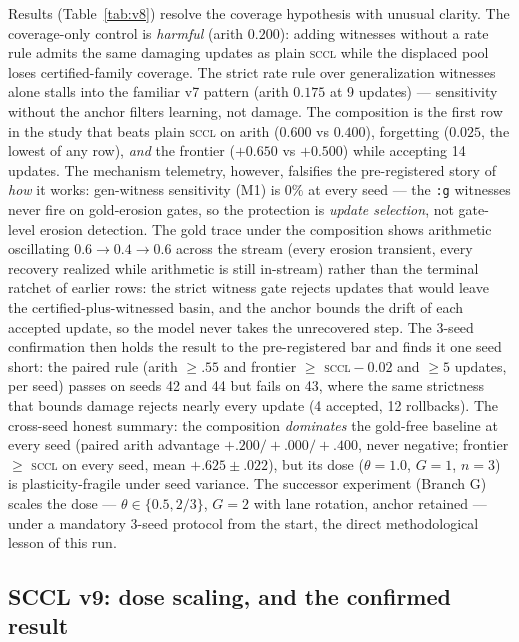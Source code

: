 \documentclass[10pt,conference]{IEEEtran}
\begin{document}
Results (Table~\ref{tab:v8}) resolve the coverage hypothesis with unusual clarity. The coverage-only control is \emph{harmful} (arith $0.200$): adding witnesses without a rate rule admits the same damaging updates as plain \textsc{sccl} while the displaced pool loses certified-family coverage. The strict rate rule over generalization witnesses alone stalls into the familiar v7 pattern (arith $0.175$ at 9 updates) --- sensitivity without the anchor filters learning, not damage. The composition is the first row in the study that beats plain \textsc{sccl} on arith ($0.600$ vs $0.400$), forgetting ($0.025$, the lowest of any row), \emph{and} the frontier ($+0.650$ vs $+0.500$) while accepting 14 updates. The mechanism telemetry, however, falsifies the pre-registered story of \emph{how} it works: gen-witness sensitivity (M1) is $0\%$ at every seed --- the \texttt{:g} witnesses never fire on gold-erosion gates, so the protection is \emph{update selection}, not gate-level erosion detection. The gold trace under the composition shows arithmetic oscillating $0.6\to0.4\to0.6$ across the stream (every erosion transient, every recovery realized while arithmetic is still in-stream) rather than the terminal ratchet of earlier rows: the strict witness gate rejects updates that would leave the certified-plus-witnessed basin, and the anchor bounds the drift of each accepted update, so the model never takes the unrecovered step. The 3-seed confirmation then holds the result to the pre-registered bar and finds it one seed short: the paired rule (arith $\geq.55$ and frontier $\geq$ \textsc{sccl}${}-0.02$ and $\geq5$ updates, per seed) passes on seeds 42 and 44 but fails on 43, where the same strictness that bounds damage rejects nearly every update (4 accepted, 12 rollbacks). The cross-seed honest summary: the composition \emph{dominates} the gold-free baseline at every seed (paired arith advantage $+.200/+.000/+.400$, never negative; frontier $\geq$ \textsc{sccl} on every seed, mean $+.625\pm.022$), but its dose ($\theta{=}1.0$, $G{=}1$, $n{=}3$) is plasticity-fragile under seed variance. The successor experiment (Branch G) scales the dose --- $\theta\in\{0.5,2/3\}$, $G{=}2$ with lane rotation, anchor retained --- under a mandatory 3-seed protocol from the start, the direct methodological lesson of this run.

\subsection*{SCCL v9: dose scaling, and the confirmed result}
\label{sec:v9}
\end{document}
